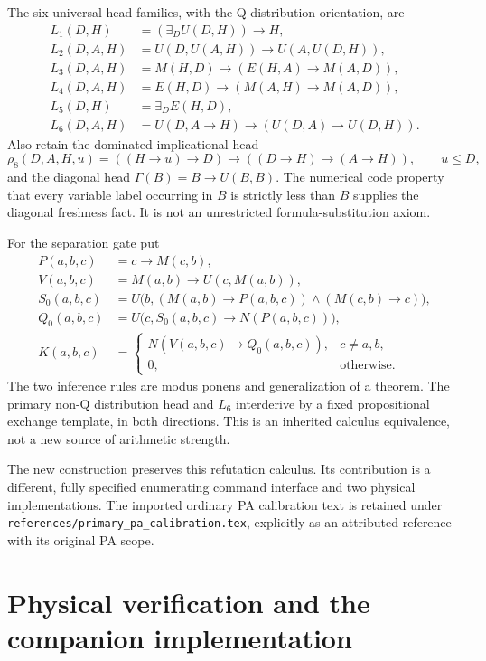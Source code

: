 \documentclass[11pt,letterpaper]{article}
\newcommand{\file}[1]{\texttt{\nolinkurl{#1}}}
\begin{document}
The six universal head families, with the Q distribution orientation, are
\begin{align*}
 L_1(D,H)&=(\exists_D U(D,H))\to H,\\
 L_2(D,A,H)&=U(D,U(A,H))\to U(A,U(D,H)),\\
 L_3(D,A,H)&=M(H,D)\to(E(H,A)\to M(A,D)),\\
 L_4(D,A,H)&=E(H,D)\to(M(A,H)\to M(A,D)),\\
 L_5(D,H)&=\exists_D E(H,D),\\
 L_6(D,A,H)&=U(D,A\to H)\to(U(D,A)\to U(D,H)).
\end{align*}
Also retain the dominated implicational head
\[
 \rho_8(D,A,H,u)=((H\to u)\to D)\to((D\to H)\to(A\to H)),
 \qquad u\le D,
\]
and the diagonal head $\Gamma(B)=B\to U(B,B)$.
The numerical code property that every variable label occurring in $B$ is
strictly less than $B$ supplies the diagonal freshness fact. It is not an
unrestricted formula-substitution axiom.

For the separation gate put
\begin{align*}
 P(a,b,c)&=c\to M(c,b),\\
 V(a,b,c)&=M(a,b)\to U(c,M(a,b)),\\
 S_0(a,b,c)&=U\bigl(b,(M(a,b)\to P(a,b,c))\wedge(M(c,b)\to c)\bigr),\\
 Q_0(a,b,c)&=U\bigl(c,S_0(a,b,c)\to N(P(a,b,c))\bigr),\\
 K(a,b,c)&=\begin{cases}N(V(a,b,c)\to Q_0(a,b,c)),&c\ne a,b,\\0,&\text{otherwise.}\end{cases}
\end{align*}
The two inference rules are modus ponens and generalization of a theorem.
The primary non-Q distribution head and $L_6$ interderive by a fixed
propositional exchange template, in both directions. This is an inherited
calculus equivalence, not a new source of arithmetic strength.

The new construction preserves this refutation calculus. Its contribution
is a different, fully specified enumerating command interface and two
physical implementations. The imported ordinary PA calibration text is
retained under \file{references/primary_pa_calibration.tex}, explicitly as
an attributed reference with its original PA scope.



\section{Physical verification and the companion implementation}
\label{sec:physical}
\end{document}
